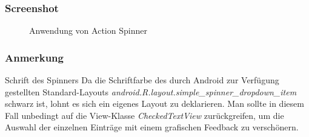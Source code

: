\begin{frame}
   \frametitle{Screenshot}
   \begin{figure}[h!]
     \centering
     \hfill
     \caption{
        Anwendung von Action Spinner
     }
     \label{fig:action_spinner}
   \end{figure}
\end{frame}

\begin{frame}
   \frametitle{Anmerkung}
   \begin{alertblock}{Schrift des Spinners}
      Da die Schriftfarbe des durch Android zur Verfügung gestellten Standard-Layouts 
      \emph{android.R.layout.simple\_spinner\_dropdown\_item} schwarz ist, lohnt es sich 
      ein eigenes Layout zu deklarieren. Man sollte in diesem Fall unbedingt auf 
      die View-Klasse \emph{CheckedTextView} zurückgreifen, um die Auswahl der 
      einzelnen Einträge mit einem grafischen Feedback zu verschönern.
   \end{alertblock}
\end{frame}
